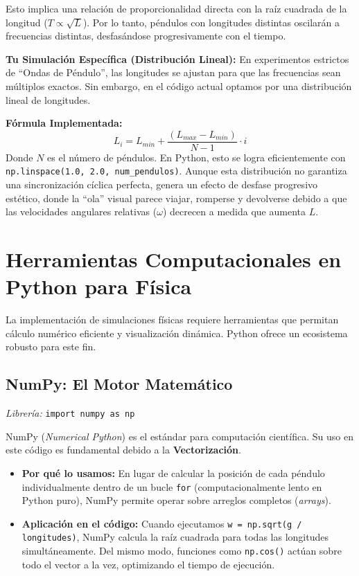 \documentclass[a4paper,11pt]{article}
\newcommand{\code}[1]{\texttt{\color{blue!60!black}#1}}
\begin{document}
	Esto implica una relación de proporcionalidad directa con la raíz cuadrada de la longitud ($T \propto \sqrt{L}$). Por lo tanto, péndulos con longitudes distintas oscilarán a frecuencias distintas, desfasándose progresivamente con el tiempo.
	
	\textbf{Tu Simulación Específica (Distribución Lineal):}
	En experimentos estrictos de ``Ondas de Péndulo'', las longitudes se ajustan para que las frecuencias sean múltiplos exactos. Sin embargo, en el código actual optamos por una distribución lineal de longitudes.
	
	\textbf{Fórmula Implementada:}
	\begin{equation}
		L_i = L_{min} + \frac{(L_{max} - L_{min})}{N - 1} \cdot i
	\end{equation}
	Donde $N$ es el número de péndulos. En Python, esto se logra eficientemente con \code{np.linspace(1.0, 2.0, num\_pendulos)}. Aunque esta distribución no garantiza una sincronización cíclica perfecta, genera un efecto de desfase progresivo estético, donde la ``ola'' visual parece viajar, romperse y devolverse debido a que las velocidades angulares relativas ($\omega$) decrecen a medida que aumenta $L$.
	
	\section{Herramientas Computacionales en Python para Física}
	
	La implementación de simulaciones físicas requiere herramientas que permitan cálculo numérico eficiente y visualización dinámica. Python ofrece un ecosistema robusto para este fin.
	
	\subsection{NumPy: El Motor Matemático}
	\textit{Librería:} \code{import numpy as np}
	
	NumPy (\textit{Numerical Python}) es el estándar para computación científica. Su uso en este código es fundamental debido a la \textbf{Vectorización}.
	
	\begin{itemize}
		\item \textbf{Por qué lo usamos:} En lugar de calcular la posición de cada péndulo individualmente dentro de un bucle \code{for} (computacionalmente lento en Python puro), NumPy permite operar sobre arreglos completos (\textit{arrays}).
		\item \textbf{Aplicación en el código:} Cuando ejecutamos \code{w = np.sqrt(g / longitudes)}, NumPy calcula la raíz cuadrada para todas las longitudes simultáneamente. Del mismo modo, funciones como \code{np.cos()} actúan sobre todo el vector a la vez, optimizando el tiempo de ejecución.
	\end{itemize}
	
\end{document}
